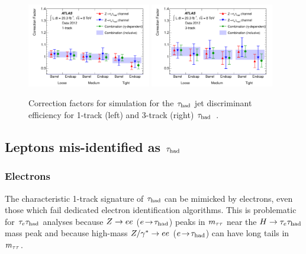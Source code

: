 \begin{figure}[tp]
  \centering
  \includegraphics[width=0.48\textwidth]{figures/PERF-2013-06/fig_11a}
  \includegraphics[width=0.48\textwidth]{figures/PERF-2013-06/fig_11b}
  \caption{Correction factors for simulation for the $\tau_\text{had}$ jet discriminant efficiency for 1-track (left) and 3-track (right) $\tau_\text{had}$~\cite{PERF-2013-06}.}
  \label{fig:taus-scalefactors}
\end{figure}

\subsection{Leptons mis-identified as $\tau_\text{had}$}
\label{sec:taus-leptonfakes}

\subsubsection{Electrons}

The characteristic 1-track signature of $\tau_\text{had}$ can be mimicked by electrons, even those which fail dedicated electron identification algorithms. This is problematic for $\tau_e \tau_\text{had}$ analyses because $Z \rightarrow ee$ ($e \!\rightarrow\!\tau_\text{had}$) peaks in $m_{\tau\tau}$ near the $H\rightarrow\tau_e \tau_\text{had}$ mass peak and because high-mass $Z/\gamma^\ast \rightarrow ee$ ($e \!\rightarrow\!\tau_\text{had}$) can have long tails in $m_{\tau\tau}$.

